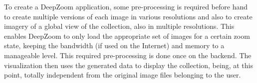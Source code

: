 To create a DeepZoom application, some pre-processing is required before hand to create multiple versions of each image in various resolutions and also to create imagery of a global view of the collection, also in multiple resolutions. This enables DeepZoom to only load the appropriate set of images for a certain zoom state, keeping the bandwidth (if used on the Internet) and memory  to a manageable level. This required pre-processing   is done once on the backend. The visualization then uses the generated data to display the collection, being, at this point, totally independent from the original image files belonging to the user.















\cleardoublepage
